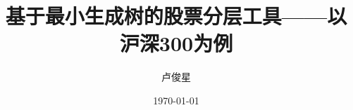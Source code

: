 \documentclass{report}
\title{基于最小生成树的股票分层工具——以沪深300为例}
\author{卢俊星}
\date{\today}
\begin{document}
\begin{CJK}{UTF8}{gbsn}

\newpage

\maketitle

\newpage

\renewcommand{\contentsname}{目录}
\tableofcontents








\nocite{*} 

\renewcommand{\refname}{参考文献}



\end{CJK}
\end{document}
